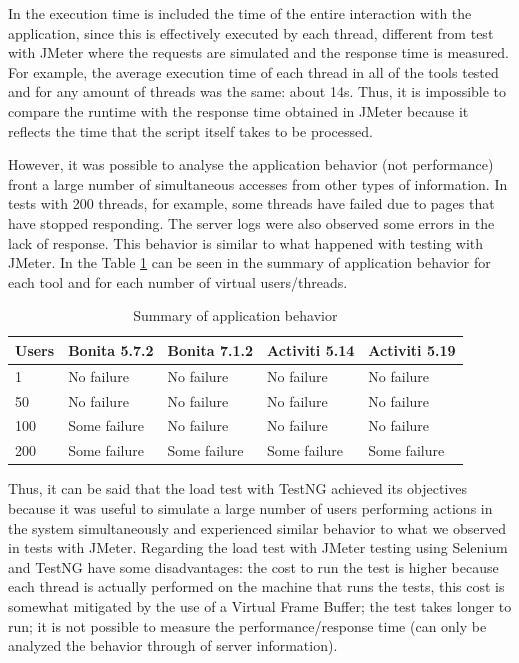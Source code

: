 \documentclass[runningheads,a4paper]{llncs}
\begin{document}
In the execution time is included the time of the entire interaction with the application, since this is effectively executed by each thread, different from test with JMeter where the requests are simulated and the response time is measured. For example, the average execution time of each thread in all of the tools tested and for any amount of threads was the same: about 14s. Thus, it is impossible to compare the runtime with the response time obtained in JMeter because it reflects the time that the script itself takes to be processed.

However, it was possible to analyse the application behavior (not performance) front a large number of simultaneous accesses from other types of information. In tests with 200 threads, for example, some threads have failed due to pages that have stopped responding. The server logs were also observed some errors in the lack of response. This behavior is similar to what happened with testing with JMeter. In the Table \ref{tab:resultadoCargaSelenium} can be seen in the summary of application behavior for each tool and for each number of virtual users/threads.

\begin{table}
\centering
\begin{tabular}{p{2cm}|p{2cm}|p{2cm}|p{2cm}|p{2cm}}
\hline
Users & Bonita 5.7.2 & Bonita 7.1.2 & Activiti 5.14 & Activiti 5.19 \\\hline
1 & No failure & No failure & No failure & No failure \\\hline
50 & No failure & No failure & No failure & No failure \\\hline
100 & Some failure & No failure & No failure & No failure \\\hline
200 & Some failure & Some failure & Some failure & Some failure \\\hline
\end{tabular}
\caption{Summary of application behavior}
\label{tab:resultadoCargaSelenium}
\end{table}

Thus, it can be said that the load test with TestNG achieved its objectives because it was useful to simulate a large number of users performing actions in the system simultaneously and experienced similar behavior to what we observed in tests with JMeter. Regarding the load test with JMeter testing using Selenium and TestNG have some disadvantages: the cost to run the test is higher because each thread is actually performed on the machine that runs the tests, this cost is somewhat mitigated by the use of a Virtual Frame Buffer; the test takes longer to run; it is not possible to measure the performance/response time (can only be analyzed the behavior through of server information).
\end{document}

